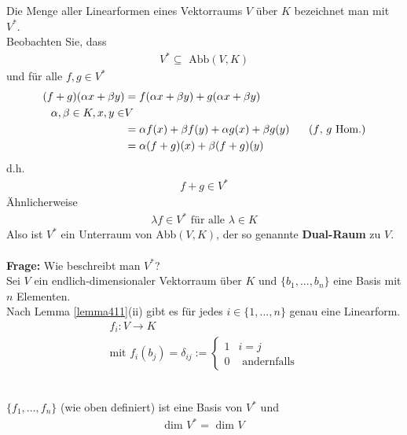 \documentclass[11pt]{report}
\newcommand*\f[1] {\textbf{#1}}
\begin{document}
Die Menge aller Linearformen eines Vektorraums $V$ über $K$ bezeichnet man mit \f{$V^*$}.\\
Beobachten Sie, dass 
\begin{align}
 V^{*} \subseteq \text{ Abb}(V,K)
\end{align}
und für alle $f, g \in V^{*}$
\begin{align}
 (f+g)(\alpha x + \beta y) &= f(\alpha x + \beta y) + g(\alpha x + \beta y)\\
\alpha, \beta \in K, x, y \in &V \\
&= \alpha f(x) + \beta f(y) + \alpha g(x) + \beta g(y) \text{\hspace*{0.5cm} ($f$, $g$ Hom.)} \\
&= \alpha(f+g)(x) + \beta(f+g)(y) 
\end{align}
d.h. 
\begin{align}
f+g \in V^{*}
\end{align}
Ähnlicherweise
\begin{align}
 \lambda f \in V^{*} \text{ für alle } \lambda \in K
\end{align}
Also ist $V^{*}$ ein Unterraum von Abb$(V,K)$, der so genannte \f{Dual-Raum} zu $V$.\\\\
\f{Frage:} Wie beschreibt man $V^{*}$? \\
Sei $V$ ein endlich-dimensionaler Vektorraum über $K$ und $\{b_1, ..., b_n\}$ eine Basis mit $n$ Elementen.\\
Nach Lemma \ref{lemma411}(ii) gibt es für jedes $i \in \{1, ..., n\}$ genau eine Linearform.
\begin{align}
 f_i: V \rightarrow K \\
\text{mit } f_i(b_j) = \delta_{ij} := \left\{\begin{matrix} 1 & i=j \\ 0 & \text{ andernfalls}\end{matrix} \right.
\end{align}

\begin{satz} {\ \\}
 \label{satz431}
 $\{f_1, ..., f_n\}$ (wie oben definiert) ist eine Basis von $V^{*}$ und 
 \begin{align}
 \text{dim } V^{*} = \text{ dim } V
 \end{align}
\end{satz}
\end{document}
